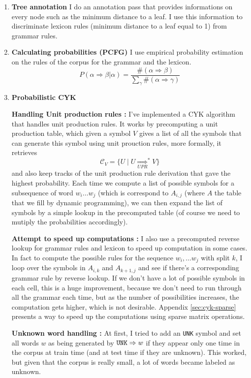 \documentclass[a4paper, 11pt]{article}
\newcommand{\itemi}[1]{\item{\textbf{#1}}}
\begin{document}
\begin{enumerate}
  \itemi{Tree annotation} I do an annotation pass that provides
  informations on every node such as the minimum distance to a leaf.
  I use this information to discriminate lexicon rules (minimum
  distance to a leaf equal to 1) from grammar rules.

  \itemi{Calculating probabilities (PCFG)} I use empirical probability
  estimation on the rules of the corpus for the grammar and the lexicon.
  \begin{displaymath}
    P(\alpha \Rightarrow \beta | \alpha) =
    \dfrac{\#(\alpha \Rightarrow \beta)}{\sum_{\gamma} \#(\alpha \Rightarrow \gamma)}
  \end{displaymath}

  \itemi{Probabilistic CYK}

  \textbf{Handling Unit production rules :}
  I've implemented a CYK algorithm that handles unit production
  rules. It works by precomputing a unit production table, which given
  a symbol $V$ gives a list of all the symbols that can generate this
  symbol using unit prouction rules, more formally, it retrieves
  \begin{displaymath}
    \mathcal{C}_V = \{
    U \mid
    U \underset{UPR}{\Longrightarrow}^* V %
    \}
  \end{displaymath}
  and also keep tracks of the unit production rule derivation that
  gave the highest probability. Each time we compute a list of
  possible symbols for a subsequence of word $w_i \dots w_j$ (which is
  correspond to $A_{i,j}$ (where $A$ the table that we fill by dynamic
  programming), we can then expand the list of symbols by a simple
  lookup in the precomputed table (of course we need to mutiply the
  probabilities accordingly).

  \textbf{Attempt to speed up computations :}
  I also use a precomputed reverse lookup for grammar rules and
  lexicon to speed up computation in some cases. In fact to compute
  the possible rules for the sequence $w_i, \dots w_j$ with split $k$,
  I loop over the symbols in $A_{i,k}$ and $A_{k+1, j}$ and see if
  there's a corresponding grammar rule by reverse lookup. If we don't
  have a lot of possible symbols in each cell, this is a huge
  improvement, because we don't need to run through all the grammar
  each time, but as the number of possibilities increases, the
  computation gets higher, which is not desirable. Appendix
  \ref{sec:cyk-sparse} presents a way to speed up the computations
  using sparse matrix operations.

  \textbf{Unknown word handling :} At first, I tried to add an
  \verb+UNK+ symbol and set all words $w$ as being generated by
  $\verb+UNK+ \Rightarrow w$ if they appear only one time in the
  corpus at train time (and at test time if they are unknown). This
  worked, but given that the corpus is really small, a lot of words
  became labeled as unknown.


\end{enumerate}
\end{document}
